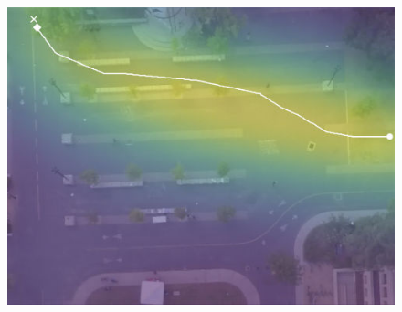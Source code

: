 \documentclass[letterpaper,10pt,conference]{ieeeconf}
\begin{document}
\begin{figure}
\begin{minipage}[c]{0.3\linewidth}
		\includegraphics[width=\linewidth]{./figures/bookstore/ours_1_2_t=370.jpg}
	\end{minipage}
	

\end{figure}
\end{document}
